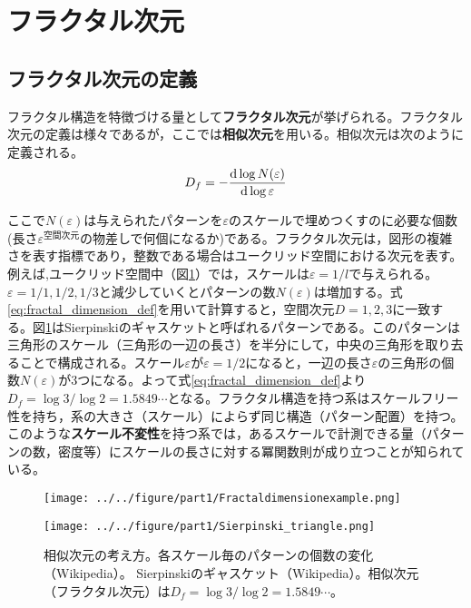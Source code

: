 \documentclass[autodetect-engine,dvi=dvipdfmx,a4paper,ja=standard,oneside,openany,11pt]{bxjsbook}
\begin{document}
\section{フラクタル次元}
\label{sec:fractal_dimension}
\subsection{フラクタル次元の定義}
フラクタル構造を特徴づける量として\textbf{フラクタル次元}が挙げられる。フラクタル次元の定義は様々であるが，ここでは\textbf{相似次元}を用いる。相似次元は次のように定義される。
\begin{equation}
  D_f=-\odv{\log N(\varepsilon)}{\log \varepsilon}
  \label{eq:fractal_dimension_def}
\end{equation}

ここで$N(\varepsilon)$は与えられたパターンを$\varepsilon$のスケールで埋めつくすのに必要な個数(長さ$\varepsilon^{\mathrm{空間次元}}$の物差しで何個になるか)である。フラクタル次元は，図形の複雑さを表す指標であり，整数である場合はユークリッド空間における次元を表す。例えば,ユークリッド空間中（図\ref{fig:fractal_stracture}）では，スケールは$\varepsilon=1/l$で与えられる。$\varepsilon=1/1,1/2,1/3$と減少していくとパターンの数$N(\varepsilon)$は増加する。式\eqref{eq:fractal_dimension_def}を用いて計算すると，空間次元$D=1,2,3$に一致する。図\ref{fig:fractal_stracture}はSierpinskiのギャスケットと呼ばれるパターンである。このパターンは三角形のスケール（三角形の一辺の長さ）を半分にして，中央の三角形を取り去ることで構成される。スケール$\varepsilon$が$\varepsilon=1/2$になると，一辺の長さ$\varepsilon$の三角形の個数$N(\varepsilon)$が3つになる。よって式\eqref{eq:fractal_dimension_def}より$D_f=\log 3/\log 2=1.5849\cdots$となる。フラクタル構造を持つ系はスケールフリー性を持ち，系の大きさ（スケール）によらず同じ構造（パターン配置）を持つ。このような\textbf{スケール不変性}を持つ系では，あるスケールで計測できる量（パターンの数，密度等）にスケールの長さに対する冪関数則が成り立つことが知られている。

\begin{figure}[htbp]
  \begin{minipage}{0.45\textwidth}
    \centering
    \subcaption{}
    \texttt{[image: ../../figure/part1/Fractaldimensionexample.png]}
    \label{fig:相似次元の考え方}
  \end{minipage}
  \begin{minipage}{0.45\textwidth}
    \centering
    \subcaption{}
    \texttt{[image: ../../figure/part1/Sierpinski\_triangle.png]}
    \label{fig:シェルピンスキーのギャスケット}
  \end{minipage}
  \caption{相似次元の考え方。各スケール毎のパターンの個数の変化（Wikipedia）。 Sierpinskiのギャスケット（Wikipedia）。相似次元（フラクタル次元）は$D_f=\log 3/\log 2=1.5849\cdots$。}
  \label{fig:fractal_stracture}
\end{figure}
\end{document}
